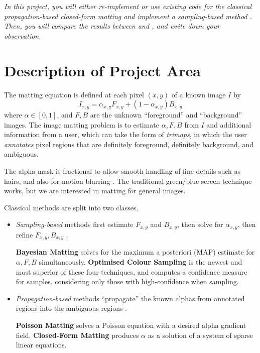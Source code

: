 \documentclass{article}
\begin{document}
\emph{In this project, you will either re-implement or use existing code for the classical propagation-based closed-form matting \cite{closed-form-matting} and implement a sampling-based method \cite{robust-matting}. Then, you will compare the results between \cite{closed-form-matting} and \cite{robust-matting}, and write down your observation.}

\section{Description of Project Area}


The matting equation is defined at each pixel $(x,y)$ of a known image $I$ by
$$I_{x,y} = \alpha_{x,y} F_{x,y}  + (1-\alpha_{x,y}) B_{x,y}$$
where $\alpha\in[0,1]$, and $F,B$ are the unknown ``foreground'' and ``background'' images. The image matting problem is to estimate $\alpha,F,B$ from $I$ and additional information from a user, which can take the form of \emph{trimaps}, in which the user \emph{annotates} pixel regions that are
definitely foreground, definitely background, and ambiguous.


The alpha mask is fractional to allow smooth handling of fine details such as hairs, and also for motion blurring \cite{bayesian-matting}. The traditional green/blue screen technique works, but we are interested in matting for general images.

Classical methods are split into two classes.
\begin{itemize}
    \item \emph{Sampling-based} methods first estimate $F_{x,y}$ and $B_{x,y}$, then solve for $\alpha_{x,y}$, then refine $F_{x,y},B_{x,y}$ \cite{dim-paper}.

    \textbf{Bayesian Matting} \cite{bayesian-matting} solves for the maximum a posteriori (MAP) estimate for $\alpha,F,B$ simultaneously. \textbf{Optimised Colour Sampling} \cite{robust-matting} is the newest and most superior of these four techniques, and computes a confidence measure for samples, considering only those with high-confidence when sampling.
    \item \emph{Propagation-based} methods ``propagate'' the known alphas from annotated regions into the ambiguous regions \cite{dim-paper}.

    \textbf{Poisson Matting} \cite{poisson-matting} solves a Poisson equation with a desired alpha gradient field. \textbf{Closed-Form Matting} \cite{closed-form-matting} produces $\alpha$ as a solution of a system of sparse linear equations.
\end{itemize}
\end{document}
